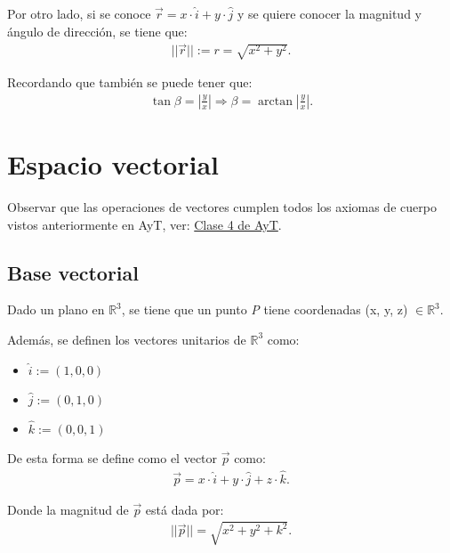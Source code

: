 \documentclass[12pt]{article}
\begin{document}
Por otro lado, si se conoce $ \vec{r} = x \cdot \hat{i} + y \cdot \hat{j}$ y se quiere conocer la magnitud y ángulo de dirección, se tiene que:
	\begin{align*}
		||\vec{r}|| := r = \sqrt{x^{2}+y^{2}}.
	\end{align*}
	
Recordando que también se puede tener que: 
	\begin{align*}
		\tan \beta = \left | \frac{y}{x} \right| \Longrightarrow \beta = \arctan \left | \frac{y}{x} \right|.
	\end{align*}
\section{Espacio vectorial}
Observar que las \color{red}operaciones \color{black} de vectores cumplen todos los axiomas de cuerpo vistos anteriormente en AyT, ver: \href{https://udeconce-my.sharepoint.com/:b:/g/personal/mamundarain2023_udec_cl/Ec3OIo1hU-lOiTwNtSQbrwYBVyos61CIGhZd4g7u684kJQ?e=Ibf6eY}{Clase 4 de AyT}.
\subsection{Base vectorial}
Dado un plano en $\mathbb{R}^{3}$, se tiene que un punto \emph{P} tiene coordenadas (x, y, z) $\in \mathbb{R}^{3}$.

Además, se definen los vectores unitarios de $\mathbb{R}^{3}$ como:
	\begin{itemize}[leftmargin=2cm]
		\item $\hat{i}:=(1,0,0)$
		\item $\hat{j}:=(0,1,0)$
		\item $\hat{k}:=(0,0,1)$
	\end{itemize}

De esta forma se define como el vector $\vec{p}$ como:
	\begin{align*}
		\vec{p}=x \cdot\hat{i}+ y\cdot \hat{j} + z \cdot \hat{k}.
	\end{align*}
	
Donde la magnitud de $\vec{p}$ está dada por:
	\begin{align*}
		||  \vec{p} || = \sqrt{x^{2}+y^{2}+k^{2}}.
	\end{align*}
\newpage
\end{document}
